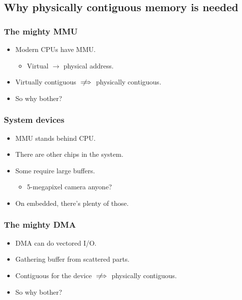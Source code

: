 \subsection{Why physically contiguous memory is needed}

\begin{frame}
  \frametitle{The mighty MMU}

  \begin{itemize}
  \item Modern CPUs have MMU.
    \begin{itemize}
    \item Virtual $\rightarrow$ physical address.
    \end{itemize}
  \item Virtually contiguous $\notimplies$ physically contiguous.
  \item So why bother?
  \end{itemize}
\end{frame}

\begin{frame}
  \frametitle{System devices}

  \begin{itemize}
  \item MMU stands behind CPU.
  \item There are other chips in the system.
  \item Some require large buffers.
    \begin{itemize}
    \item 5-megapixel camera anyone?
    \end{itemize}
  \item On embedded, there's plenty of those.
  \end{itemize}
\end{frame}

\begin{frame}
  \frametitle{The mighty DMA}

  \begin{itemize}
  \item DMA can do vectored I/O.
  \item Gathering buffer from scattered parts.
  \item Contiguous for the device $\notimplies$ physically contiguous.
  \item So why bother?
  \end{itemize}
\end{frame}

